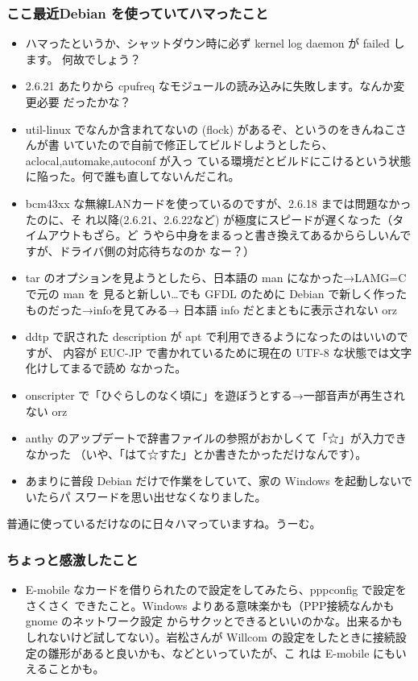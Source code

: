 \documentclass[mingoth,a4paper]{jsarticle}
\begin{document}
\subsubsection{ここ最近Debian を使っていてハマったこと}
\begin{itemize}
 \item ハマったというか、シャットダウン時に必ず kernel log daemon が failed します。
 何故でしょう？
 \item 2.6.21 あたりから cpufreq なモジュールの読み込みに失敗します。なんか変更必要
 だったかな？
 \item util-linux でなんか含まれてないの (flock) があるぞ、というのをきんねこさんが書
 いていたので自前で修正してビルドしようとしたら、aclocal,automake,autoconf が入っ
 ている環境だとビルドにこけるという状態に陥った。何で誰も直してないんだこれ。
 \item bcm43xx な無線LANカードを使っているのですが、2.6.18 までは問題なかったのに、そ
 れ以降(2.6.21、2.6.22など) が極度にスピードが遅くなった（タイムアウトもざら。ど
 うやら中身をまるっと書き換えてあるかららしいんですが、ドライバ側の対応待ちなのか
 なー？）
 \item tar のオプションを見ようとしたら、日本語の man になかった→LAMG=C で元の man を
 見ると新しい…でも GFDL のために Debian で新しく作ったものだった→infoを見てみる→
 日本語 info だとまともに表示されない orz
 \item ddtp で訳された description が apt で利用できるようになったのはいいのですが、
 内容が EUC-JP で書かれているために現在の UTF-8 な状態では文字化けしてまるで読め
 なかった。
 \item onscripter で「ひぐらしのなく頃に」を遊ぼうとする→一部音声が再生されない orz
 \item anthy のアップデートで辞書ファイルの参照がおかしくて「☆」が入力できなかった
 （いや、「はて☆すた」とか書きたかっただけなんです）。
 \item あまりに普段 Debian だけで作業をしていて、家の Windows を起動しないでいたらパ
 スワードを思い出せなくなりました。
\end{itemize}

普通に使っているだけなのに日々ハマっていますね。うーむ。


\subsubsection{ちょっと感激したこと}

\begin{itemize}
 \item  E-mobile なカードを借りられたので設定をしてみたら、pppconfig で設定をさくさく
 できたこと。Windows よりある意味楽かも（PPP接続なんかも gnome のネットワーク設定
 からサクッとできるといいのかな。出来るかもしれないけど試してない）。岩松さんが
 Willcom の設定をしたときに接続設定の雛形があると良いかも、などといっていたが、こ
 れは E-mobile にもいえることかも。
\end{itemize}
\end{document}
